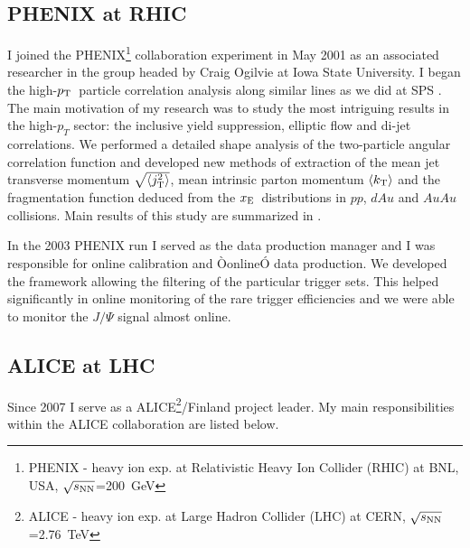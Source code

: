 \documentclass[12pt]{article}
\def\la{\left< }
\def\ra{\right> }
\def\mean#1{\ensuremath{\la#1\ra}}
\def\meankv#1{\ensuremath{\la#1^2\ra}}
\def\sqrtrms#1{\ensuremath{\sqrt{\meankv{#1}}}}
\def\pt#1{\ensuremath{p_{\rm T#1}}}
\def\kt#1{\ensuremath{k_{\rm T#1}}}
\def\jt#1{\ensuremath{j_{\rm T#1}}}
\newcommand{\xe} {\ensuremath{x_{\rm E}}}
\begin{document}
\subsection{PHENIX at RHIC}

I joined the PHENIX\footnote{PHENIX - heavy ion exp. at Relativistic Heavy Ion Collider (RHIC) at BNL, USA, $\sqrt{s_{\rm NN}}$=200~GeV} collaboration  experiment  in May 2001 as an associated researcher in the group headed by Craig Ogilvie at Iowa State University. I began the high-\pt{}\  particle correlation analysis along similar lines as we did at SPS \cite{Agakichiev:2003gg}.  The main motivation of my research was to study the most intriguing results in the high-$p_T$ sector: the inclusive yield suppression, elliptic flow and di-jet correlations.  We performed a detailed shape analysis of the two-particle angular correlation function and developed new methods of extraction of the mean jet transverse momentum \sqrtrms{\jt{}}, mean intrinsic parton momentum \mean{\kt{}} and the fragmentation function deduced from the \xe\ distributions in $pp$, $dAu$ and $AuAu$ collisions. Main results of this study are summarized in \cite{Adler:2006sc}.

In the 2003 PHENIX run I served as the data production manager and I was responsible for online calibration and ÒonlineÓ data production.  We developed the framework allowing the filtering of the particular trigger sets. This helped significantly in online monitoring of the rare trigger efficiencies and we were able to monitor the $J/\Psi$ signal almost online. 

\subsection{ALICE at LHC}
Since 2007 I serve as a ALICE\footnote{ALICE - heavy ion exp. at Large Hadron Collider (LHC) at CERN, $\sqrt{s_{\rm NN}}$=2.76~TeV}/Finland
  project leader. My main responsibilities within the ALICE collaboration are listed below. 
\end{document}
